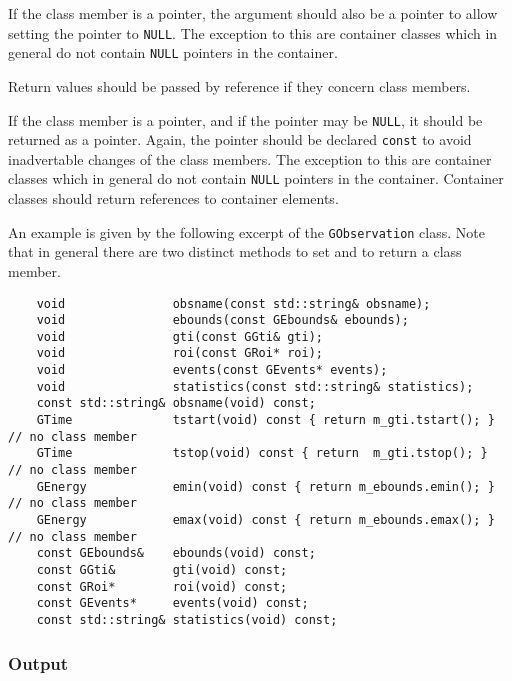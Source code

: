 \documentclass{article}[12pt,a4]
\begin{document}
If the class member is a pointer, the argument should also be a pointer to allow
setting the pointer to {\tt NULL}.
The exception to this are container classes which in general do not contain
{\tt NULL} pointers in the container.

Return values should be passed by reference if they concern class members.

If the class member is a pointer, and if the pointer may be {\tt NULL}, it should be
returned as a pointer.
Again, the pointer should be declared {\tt const} to avoid inadvertable changes of
the class members.
The exception to this are container classes which in general do not contain
{\tt NULL} pointers in the container.
Container classes should return references to container elements.

An example is given by the following excerpt of the {\tt GObservation} class.
Note that in general there are two distinct methods to set and to return a
class member.
\begin{verbatim}
    void               obsname(const std::string& obsname);
    void               ebounds(const GEbounds& ebounds);
    void               gti(const GGti& gti);
    void               roi(const GRoi* roi);
    void               events(const GEvents* events);
    void               statistics(const std::string& statistics);
    const std::string& obsname(void) const;
    GTime              tstart(void) const { return m_gti.tstart(); }  // no class member
    GTime              tstop(void) const { return  m_gti.tstop(); }   // no class member
    GEnergy            emin(void) const { return m_ebounds.emin(); }  // no class member
    GEnergy            emax(void) const { return m_ebounds.emax(); }  // no class member
    const GEbounds&    ebounds(void) const;
    const GGti&        gti(void) const;
    const GRoi*        roi(void) const;
    const GEvents*     events(void) const;
    const std::string& statistics(void) const;
\end{verbatim}


\subsubsection{Output}
\label{sec:output}
\end{document}
